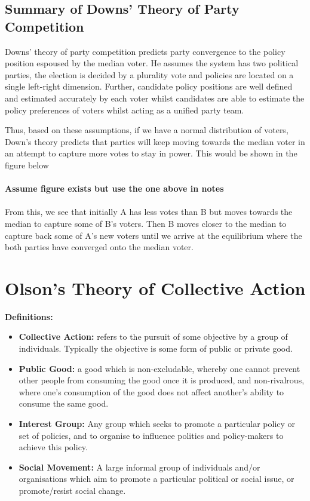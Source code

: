 \documentclass[12pt, letterpaper]{article}
\begin{document}
\subsection{Summary of Downs' Theory of Party Competition}
Downs' theory of party competition predicts party convergence to the policy position espoused by the median voter. He assumes the system has two political parties, the election is decided by a plurality vote and policies are located on a single left-right dimension. Further, candidate policy positions are well defined and estimated accurately by each voter whilst candidates are able to estimate the policy preferences of voters whilst acting as a unified party team.

Thus, based on these assumptions, if we have a normal distribution of voters, Down's theory predicts that parties will keep moving towards the median voter in an attempt to capture more votes to stay in power. This would be shown in the figure below\\\\
\textbf{Assume figure exists but use the one above in notes}
\\\\
From this, we see that initially A has less votes than B but moves towards the median to capture some of B's voters. Then B moves closer to the median to capture back some of A's new voters until we arrive at the equilibrium where the both parties have converged onto the median voter.



\newpage
\section{Olson's Theory of Collective Action}
\textbf{Definitions:} 
\begin{itemize}	
	\item \textbf{Collective Action:} refers to the pursuit of some objective by a group of individuals. Typically the objective is some form of public or private good.
	\item \textbf{Public Good:} a good which is non-excludable, whereby one cannot prevent other people from consuming the good once it is produced, and non-rivalrous, where one's consumption of the good does not affect another's ability to consume the same good.
	\item \textbf{Interest Group:} Any group which seeks to promote a particular policy or set of policies, and to organise to influence politics and policy-makers to achieve this policy.
	\item \textbf{Social Movement:} A large informal group of individuals and/or organisations which aim to promote a particular political or social issue, or promote/resist social change.

\end{itemize}
\end{document}
